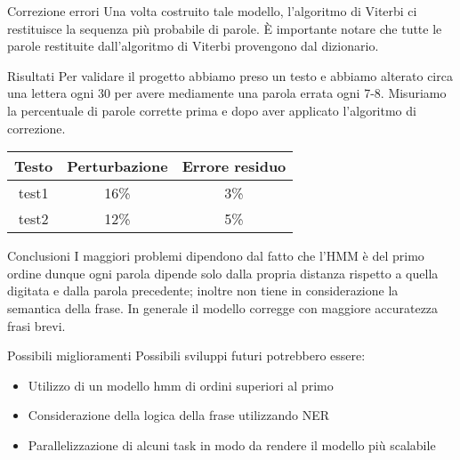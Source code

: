 \documentclass{beamer}
\begin{document}
\begin{frame}{Correzione errori}
 Una volta costruito tale modello, l'algoritmo di Viterbi ci restituisce la sequenza più probabile di parole. È importante notare che tutte le parole 
restituite dall'algoritmo di Viterbi provengono dal dizionario.
\end{frame}

\begin{frame}{Risultati}
 Per validare il progetto abbiamo preso un testo e abbiamo alterato circa una lettera ogni 30 per avere mediamente una parola errata ogni 7-8. 
Misuriamo la percentuale di parole corrette prima e dopo aver applicato l'algoritmo di correzione.\\
\vspace{0.5cm}
 
 \centering
 \begin{tabular}{|c|c|c|}
 \hline
  \textbf{Testo} & \textbf{Perturbazione} & \textbf{Errore residuo}\\
 \hline
 	test1 & 16\% &  3\% \\
 \hline 
    test2 & 12\% & 5\%\\
 \hline
 \end{tabular}
\end{frame}

\begin{frame}{Conclusioni}
  I maggiori problemi dipendono dal fatto che l'HMM è del primo ordine dunque ogni parola dipende solo dalla propria distanza rispetto a quella 
digitata 
  e dalla parola precedente; inoltre non tiene in considerazione la semantica della frase. In generale il modello corregge con maggiore accuratezza 
frasi
  brevi.
\end{frame}
\begin{frame}{Possibili miglioramenti}
	Possibili sviluppi futuri potrebbero essere:
    \begin{itemize}
    	\item Utilizzo di un modello hmm di ordini superiori al primo
        \item Considerazione della logica della frase utilizzando NER
        \item Parallelizzazione di alcuni task in modo da rendere il modello più scalabile
    \end{itemize}
\end{frame}
\end{document}
